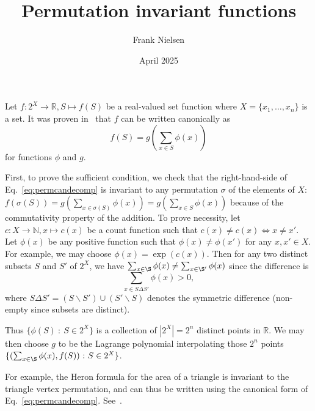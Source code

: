 \documentclass{article}
\begin{document}
\def\bbR{\mathbb{R}}
\def\bbN{\mathbb{N}}
\def\st{{\ :\ }}

\title{Permutation invariant functions}
\author{Frank Nielsen}
\date{April 2025}
\maketitle

Let $f: 2^X\rightarrow\bbR,  S\mapsto f(S)$ be a real-valued set function where $X=\{x_1,\ldots, x_n\}$ is a set.
It was proven in~\cite{deepset-2017} that $f$ can be written canonically as
\begin{equation}\label{eq:permcandecomp}
f(S)=g\left(\sum_{x\in S} \phi(x)\right)
\end{equation}
for functions $\phi$ and $g$.

First, to prove the sufficient condition, we check that the right-hand-side of Eq.~\ref{eq:permcandecomp} is invariant to any permutation $\sigma$ of the elements of $X$: $f(\sigma(S))=g\left(\sum_{x\in\sigma(S)} \phi(x)\right)=g\left(\sum_{x\in S} \phi(x)\right)$ because of the commutativity property of the addition.
To prove necessity, let $c: X\rightarrow\bbN, x\mapsto c(x)$ be a count function such that $c(x)\not=c(x)\Leftrightarrow x\not=x'$.
Let $\phi(x)$ be any positive function such that $\phi(x)\not=\phi(x')$ for any $x,x'\in X$.
For example, we may choose $\phi(x)=\exp(c(x))$.
Then for any two distinct subsets $S$ and $S'$ of $2^X$, we have $\sum_{x\in\S} \phi(x)\not = \sum_{x\in\S'} \phi(x)$ since the difference is
$$
\sum_{x\in S\Delta S'} \phi(x)>0,
$$
where $S\Delta S'=(S\backslash S')\cup (S'\backslash S)$ denotes the symmetric difference (non-empty since  subsets are distinct).

Thus $\{\phi(S)\st S\in 2^X\}$ is a collection of $|2^X|=2^n$ distinct points in $\bbR$.
We may then choose $g$ to be the Lagrange polynomial interpolating those $2^n$ points $\{(\sum_{x\in\S} \phi(x),f(S))\st S\in 2^X\}$.

For example, the Heron formula for the area of a triangle is invariant to the triangle vertex permutation, and can thus be written using the canonical form of Eq.~\ref{eq:permcandecomp}. See~\cite{DeepSetHeron-2025}.




\end{document}
